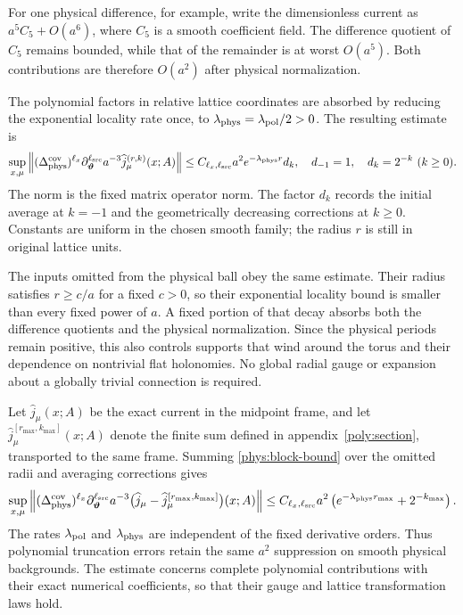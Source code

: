 \documentclass[11pt,a4paper]{article}
\theoremstyle{remark}
\begin{document}
For one physical difference, for example, write the dimensionless current
as $a^5 C_5+O(a^6)$, where $C_5$ is a smooth coefficient field.
The difference quotient of $C_5$ remains bounded, while that of the
remainder is at worst $O(a^5)$. Both contributions are therefore
$O(a^2)$ after physical normalization.

The polynomial factors in relative lattice coordinates are absorbed
by reducing the exponential locality rate once, to
$\lambda_{\rm phys}=\lambda_{\rm pol}/2>0$. The resulting estimate is
\begin{equation}
 \sup_{x,\mu}
 \left\|(\Delta_{\rm phys}^{\rm cov})^{\ell_x}
       \partial_{\boldsymbol\vartheta}^{\ell_{\rm src}}
       a^{-3}\widehat j_\mu^{(r,k)}(x;A)\right\|
 \leq C_{\ell_x,\ell_{\rm src}}a^2
           e^{-\lambda_{\rm phys}r}d_k,
 \quad d_{-1}=1,\quad d_k=2^{-k}\ (k\geq0).
 \label{phys:block-bound}
\end{equation}
The norm is the fixed matrix operator norm. The factor $d_k$ records
the initial average at $k=-1$ and the geometrically decreasing
corrections at $k\ge0$. Constants are uniform in the chosen smooth
family; the radius $r$ is still in original lattice units.

The inputs omitted from the physical ball obey the same estimate. Their
radius satisfies $r\ge c/a$ for a fixed $c>0$, so their exponential
locality bound is smaller than every fixed power of $a$. A fixed
portion of that decay absorbs both the difference quotients and the
physical normalization. Since the physical periods remain positive,
this also controls supports that wind around the torus and their
dependence on nontrivial flat holonomies. No global radial gauge or
expansion about a globally trivial connection is required.

Let $\widehat j_\mu(x;A)$ be the exact current in the midpoint frame,
and let $\widehat j_\mu^{[r_{\max},k_{\max}]}(x;A)$ denote the
finite sum defined in appendix~\ref{poly:section}, transported to the
same frame. Summing \eqref{phys:block-bound} over the omitted radii
and averaging corrections gives
\begin{equation}
 \sup_{x,\mu}
 \left\|(\Delta_{\rm phys}^{\rm cov})^{\ell_x}
       \partial_{\boldsymbol\vartheta}^{\ell_{\rm src}}
       a^{-3}\bigl(\widehat j_\mu-\widehat j_\mu^{[r_{\max},k_{\max}]}\bigr)
                              (x;A)\right\|
 \leq C_{\ell_x,\ell_{\rm src}}a^2
       \left(e^{-\lambda_{\rm phys}r_{\max}}+2^{-k_{\max}}\right).
 \label{phys:prefix-bound}
\end{equation}
The rates $\lambda_{\rm pol}$ and $\lambda_{\rm phys}$ are
independent of the fixed derivative orders. Thus polynomial truncation
errors retain the same $a^2$ suppression on smooth physical
backgrounds. The estimate concerns complete polynomial contributions
with their exact numerical coefficients, so that their gauge and
lattice transformation laws hold.
\end{document}
